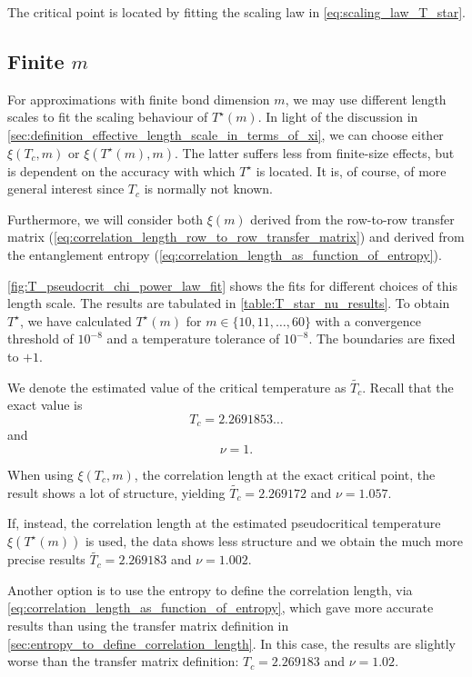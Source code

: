 The critical point is located by fitting the scaling law in \autoref{eq:scaling_law_T_star}.

\subsection{Finite $m$}
For approximations with finite bond dimension $m$, we may use different length scales to fit the scaling behaviour of
$T^{\star}(m)$.
In light of the discussion in \autoref{sec:definition_effective_length_scale_in_terms_of_xi},
we can choose either $\xi(T_c, m)$ or $\xi(T^{\star}(m), m)$.
The latter suffers less from finite-size effects, but is dependent on the accuracy with which $T^{\star}$ is located.
It is, of course, of more general interest since $T_c$ is normally not known.

Furthermore, we will consider both $\xi(m)$ derived from the row-to-row transfer matrix
(\autoref{eq:correlation_length_row_to_row_transfer_matrix}) and derived from the entanglement entropy
(\autoref{eq:correlation_length_as_function_of_entropy}).

\autoref{fig:T_pseudocrit_chi_power_law_fit} shows the fits for different choices of this length scale.
The results are tabulated in \autoref{table:T_star_nu_results}.
To obtain $T^{\star}$, we have calculated $T^{\star}(m)$ for $m \in \{10,
11, \dots, 60\}$ with a convergence threshold of $10^{-8}$ and a temperature tolerance of $10^{-8}$.
The boundaries are fixed to $+1$.

We denote the estimated value of the critical temperature as $\widetilde{T_c}$. Recall that the exact value is
\begin{equation}
  T_c = 2.2691853\dots
\end{equation}
and
\begin{equation}
  \nu = 1.
\end{equation}

When using $\xi(T_c, m)$, the correlation length at the exact critical point,
the result shows a lot of structure, yielding $\widetilde{T_c} = 2.269172$ and $\nu = 1.057$.

If, instead, the correlation length at the estimated pseudocritical temperature $\xi(T^{\star}(m))$ is used,
the data shows less structure and we obtain the much more precise results $\widetilde{T_c} = 2.269183$ and $\nu =
1.002$.

Another option is to use the entropy to define the correlation length,
via \autoref{eq:correlation_length_as_function_of_entropy}, which gave more accurate results than using the transfer
matrix definition in \autoref{sec:entropy_to_define_correlation_length}.
In this case, the results are slightly worse than the transfer matrix definition:
$T_c = 2.269183$ and $\nu = 1.02$.


